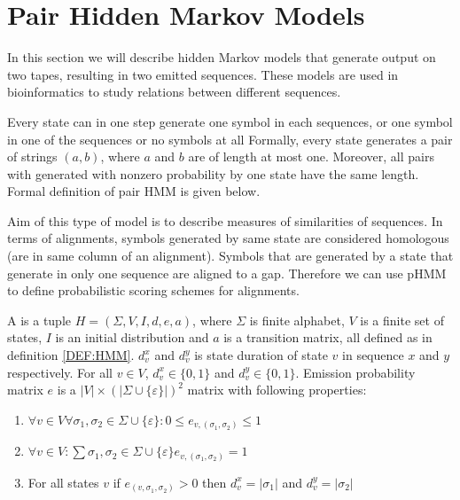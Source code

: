 \section{Pair Hidden Markov Models}
In this section we will describe hidden Markov models that generate output on
two tapes, resulting in two emitted sequences. These models are used in
bioinformatics to study relations between different sequences.


Every state can in one step generate one symbol in each sequences, or one symbol
in one of the sequences or no symbols at all
Formally, every state generates a pair of strings $(a,b)$, where $a$
and $b$ are of length at most one.
Moreover, all pairs with generated with nonzero probability by one state have
the same length.  Formal definition of pair HMM is given below.

Aim of this type of model is to describe measures of similarities of sequences.
In terms of alignments, symbols generated by same state are considered
homologous (are in same column of an alignment). Symbols that are generated by a
state that generate in only one sequence are aligned to a gap. Therefore we can
use pHMM to define probabilistic scoring schemes for alignments.


\begin{definition}
A  is a tuple $H=(\Sigma,V,I,d,e,a)$, where $\Sigma$ is finite
alphabet, $V$ is a finite set of states, $I$ is an initial distribution and $a$ is
a transition matrix, all defined as
in definition \ref{DEF:HMM}. $d^x_v$ and $d^y_v$ is state duration of state $v$
in sequence $x$ and $y$ respectively. For all $v\in V$,
$d^x_v\in \{0,1\}$ and $d^y_v\in \{0,1\}$.
Emission probability matrix $e$ is
a $|V|\times\left(|\Sigma\cup\{\varepsilon\}|\right)^2$ matrix with following
properties:
\begin{enumerate}
\item
$\forall v\in V\forall \sigma_1,\sigma_2\in\Sigma\cup\{\varepsilon\}:
0\leq e_{v,(\sigma_1,\sigma_2)}\leq 1$

\item 
$\forall v\in V:
\sum {\sigma_1,\sigma_2\in\Sigma\cup\{\varepsilon\}}e_{v,(\sigma_1,\sigma_2)} = 1$

\item For all states $v$ if $e_{(v,\sigma_1,\sigma_2)}>0$ then
$d^x_v=|\sigma_1|$ and $d^y_v=|\sigma_2|$
\end{enumerate}

\end{definition}

